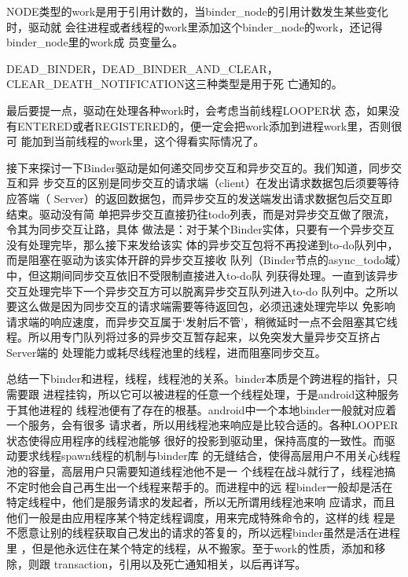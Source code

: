 \documentclass[a4paper,11pt]{article}
\begin{document}
NODE类型的work是用于引用计数的，当binder_node的引用计数发生某些变化时，驱动就
会往进程或者线程的work里添加这个binder_node的work，还记得binder_node里的work成
员变量么。

DEAD_BINDER，DEAD_BINDER_AND_CLEAR，CLEAR_DEATH_NOTIFICATION这三种类型是用于死
亡通知的。

最后要提一点，驱动在处理各种work时，会考虑当前线程LOOPER状
态，如果没有ENTERED或者REGISTERED的，便一定会把work添加到进程work里，否则很可
能加到当前线程的work里，这个得看实际情况了。


接下来探讨一下Binder驱动是如何递交同步交互和异步交互的。我们知道，同步交互和异
步交互的区别是同步交互的请求端（client）在发出请求数据包后须要等待应答端（
Server）的返回数据包，而异步交互的发送端发出请求数据包后交互即结束。驱动没有简
单把异步交互直接扔往todo列表，而是对异步交互做了限流，令其为同步交互让路，具体
做法是：对于某个Binder实体，只要有一个异步交互没有处理完毕，那么接下来发给该实
体的异步交互包将不再投递到to-do队列中，而是阻塞在驱动为该实体开辟的异步交互接收
队列（Binder节点的async_todo域）中，但这期间同步交互依旧不受限制直接进入to-do队
列获得处理。一直到该异步交互处理完毕下一个异步交互方可以脱离异步交互队列进入to-do
队列中。之所以要这么做是因为同步交互的请求端需要等待返回包，必须迅速处理完毕以
免影响请求端的响应速度，而异步交互属于‘发射后不管’，稍微延时一点不会阻塞其它线
程。所以用专门队列将过多的异步交互暂存起来，以免突发大量异步交互挤占Server端的
处理能力或耗尽线程池里的线程，进而阻塞同步交互。


总结一下binder和进程，线程，线程池的关系。binder本质是个跨进程的指针，只需要跟
进程挂钩，所以它可以被进程的任意一个线程处理，于是android这种服务于其他进程的
线程池便有了存在的根基。android中一个本地binder一般就对应着一个服务，会有很多
请求者，所以用线程池来响应是比较合适的。各种LOOPER状态使得应用程序的线程池能够
很好的投影到驱动里，保持高度的一致性。而驱动要求线程spawn线程的机制与binder库
的无缝结合，使得高层用户不用关心线程池的容量，高层用户只需要知道线程池他不是一
个线程在战斗就行了，线程池搞不定时他会自己再生出一个线程来帮手的。而进程中的远
程binder一般却是活在特定线程中，他们是服务请求的发起者，所以无所谓用线程池来响
应请求，而且他们一般是由应用程序某个特定线程调度，用来完成特殊命令的，这样的线
程是不愿意让别的线程获取自己发出的请求的答复的，所以远程binder虽然是活在进程里
，但是他永远住在某个特定的线程，从不搬家。至于work的性质，添加和移除，则跟
transaction，引用以及死亡通知相关，以后再详写。
\end{document}
